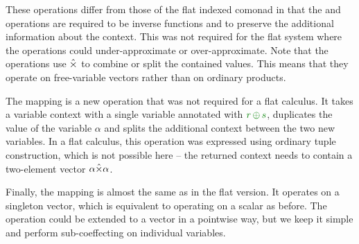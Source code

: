 \noindent
These operations differ from those of the flat indexed comonad in that the  and 
 operations are required to be inverse functions and to preserve the additional 
information about the context. This was not required for the flat system where the operations
could under-approximate or over-approximate. Note that the operations use $\hat{\times}$ to combine 
or split the contained values. This means that they operate on free-variable vectors rather than 
on ordinary products.

The  mapping is a new operation that was not required for a flat calculus. It 
takes a variable context with a single variable annotated with $\cclrd{r}\,\cpar\,\cclrd{s}$,
duplicates the value of the variable $\alpha$ and splits the additional context between the two
new variables. In a flat calculus, this operation was expressed using ordinary tuple 
construction, which is not possible here -- the returned context needs to contain a 
two-element vector $\alpha \hat{\times} \alpha$.

Finally, the  mapping is almost the same as in the flat version. It
operates on a singleton vector, which is equivalent to operating on a scalar as before.
The operation could be extended to a vector in a pointwise way, but we keep it simple
and perform sub-coeffecting on individual variables.



